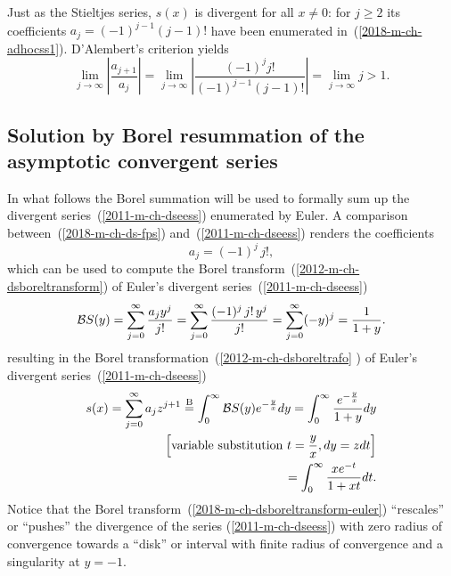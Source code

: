 Just as the Stieltjes series,
$s(x)$ is divergent for all $x\neq 0$:
for $j \ge 2$
its coefficients
$ a_j = (-1)^{j-1} (j-1)! $
have been enumerated in~(\ref{2018-m-ch-adhocss1}).
D'Alembert's criterion
yields
\begin{equation}
\lim_{j \rightarrow \infty}\left| \frac{ a_{j+1} }{ a_j } \right|
=
\lim_{j \rightarrow \infty}\left| \frac{ (-1)^{j} j! }{ (-1)^{j-1} (j-1)! } \right|
=\lim_{j \rightarrow \infty} j > 1 .
\end{equation}




\subsection*{Solution by Borel resummation of the asymptotic convergent series}
In what follows the Borel summation will be used to formally sum up
the divergent series~(\ref{2011-m-ch-dseess}) enumerated by Euler.
A comparison
between~(\ref{2018-m-ch-ds-fps})
and~(\ref{2011-m-ch-dseess})
renders the coefficients
\begin{equation}
a_j =  (-1)^j \, j!,
\label{2019-mm-ch-dsboreltransform-euler}
\end{equation}
which can be used to compute the Borel transform~(\ref{2012-m-ch-dsboreltransform}) of Euler's divergent
series~(\ref{2011-m-ch-dseess})
\begin{equation}
{\cal B}S (y)
=
  \sum_{j=0}^\infty   \frac{a_j y^j}{j!}
  =   \sum_{j=0}^\infty   \frac{(-1)^j \, j!\, y^j}{j!}
  =   \sum_{j=0}^\infty    (-y)^j  = \frac{1}{1+y}
.
\label{2018-m-ch-dsboreltransform-euler}
\end{equation}
resulting in the Borel transformation~(\ref{2012-m-ch-dsboreltrafo} ) of Euler's divergent
series~(\ref{2011-m-ch-dseess})
\begin{equation}
\begin{split}
s(x) = \sum_{j=0}^\infty
a_j z^{j+1}
\stackrel{{\rm B}}{=}
\int_0^\infty {\cal B}S (y)  e^{-\frac{y}{x}}   dy
= \int_0^\infty \frac{ e^{-\frac{y}{x}} }{1+y}    dy \\
\left[\textrm{variable substitution } t =  \frac{y}{x} , dy =  z dt \right]\\
= \int_0^\infty \frac{ x e^{-t }}{1+xt}    dt
.
\end{split}
\label{2018-m-ch-dsboreltrafo2-Euler}
\end{equation}
Notice\cite{rousseau-2004} that the Borel transform~(\ref{2018-m-ch-dsboreltransform-euler})
``rescales'' or
``pushes'' the divergence of the series (\ref{2011-m-ch-dseess}) with zero radius of convergence
towards a ``disk'' or interval with finite radius of convergence and a singularity at $y=-1$.


